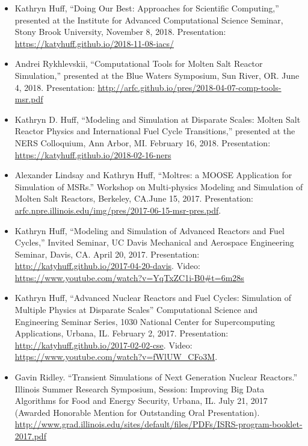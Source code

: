 \documentclass[letterpaper]{article}
\begin{document}
\begin{itemize}
        \item Kathryn Huff, ``Doing Our Best: Approaches for Scientific 
                Computing,'' presented at the Institute for Advanced 
                Computational Science Seminar, Stony Brook University, November 
                8, 2018. Presentation: 
                \url{https://katyhuff.github.io/2018-11-08-iacs/} 
        \item Andrei Rykhlevskii, ``Computational Tools for Molten Salt Reactor 
                Simulation,'' presented at the Blue Waters Symposium, Sun 
                River, OR. June 4, 2018. Presentation: 
                \url{http://arfc.github.io/pres/2018-04-07-comp-tools-msr.pdf}
        \item Kathryn D. Huff, ``Modeling and Simulation at Disparate Scales: 
                Molten Salt Reactor Physics and International Fuel Cycle 
                Transitions,'' presented at the NERS Colloquium, Ann Arbor, MI. 
                February 16, 2018. Presentation: 
                \url{https://katyhuff.github.io/2018-02-16-ners}
        \item Alexander Lindsay and Kathryn Huff, ``Moltres: a MOOSE 
                Application for Simulation of MSRs.'' Workshop on Multi-physics 
                Modeling and Simulation of Molten Salt Reactors, Berkeley, 
                CA.June 15, 2017. Presentation: 
        \url{arfc.npre.illinois.edu/img/pres/2017-06-15-msr-pres.pdf}. 
        \item Kathryn Huff, ``Modeling and Simulation of Advanced Reactors and 
                Fuel Cycles,'' Invited Seminar, UC Davis Mechanical and 
                Aerospace Engineering Seminar, Davis, CA. April 20, 2017. 
                Presentation: \url{http://katyhuff.github.io/2017-04-20-davis}. 
                Video: 
                \url{https://www.youtube.com/watch?v=YqTxZC1i-B0#t=6m28s}
        \item Kathryn Huff, ``Advanced Nuclear Reactors and Fuel Cycles: 
                Simulation of Multiple Physics at Disparate Scales'' 
                Computational Science and Engineering Seminar Series, 1030 
                National Center for Supercomputing Applications, Urbana, IL. 
                February 2, 2017. Presentation: 
                \url{http://katyhuff.github.io/2017-02-02-cse}.  Video: 
                \url{https://www.youtube.com/watch?v=fWlUW_CFo3M}.
        \item Gavin Ridley. ``Transient Simulations of Next Generation Nuclear 
                Reactors.'' Illinois Summer Research Symposium, Session: 
                Improving Big Data Algorithms for Food and Energy Security, 
                Urbana, IL. July 21, 2017 (Awarded Honorable Mention for 
                Outstanding Oral Presentation). \url{http://www.grad.illinois.edu/sites/default/files/PDFs/ISRS-program-booklet-2017.pdf}
\end{itemize}
\end{document}
